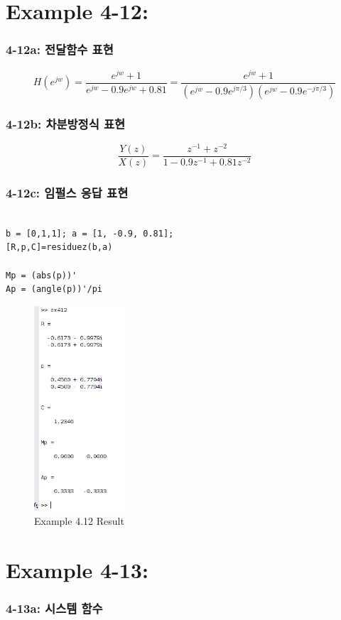 \documentclass[11pt
  , a4paper
  , article
  , oneside
]{memoir}
\begin{document}
\clearpage

\chapter{Example 4-12:}
\subsection{4-12a: 전달함수 표현}

\begin {equation}
H(e^{jw}) = \frac{e^{jw}+1}{e^{jw}-0.9e^{jw} +0.81} = \frac{e^{jw}+1}{(e^{jw}-0.9e^{j\pi/3})(e^{jw}-0.9e^{-j\pi/3})}
\end {equation}

\subsection{4-12b: 차분방정식 표현}
\begin {equation}
\frac{Y(z)}{X(z)} = \frac{z^{-1} + z^{-2}}{1-0.9z^{-1}+0.81z^{-2}}
\end {equation}

\subsection{4-12c: 임펄스 응답 표현}

\begin{lstlisting}[style=termstyle]
%Example 4.12

b = [0,1,1]; a = [1, -0.9, 0.81];
[R,p,C]=residuez(b,a)

Mp = (abs(p))'
Ap = (angle(p))'/pi
\end{lstlisting}

\begin{figure}[h!]
	\centering
	\includegraphics[width=0.3\textwidth,height=0.15\textwidth]{./images/ex412.png}
	\caption{Example 4.12 Result}
	\label{fig:Example 4.12 Result}
\end{figure}

\chapter{Example 4-13:}
\subsection{4-13a: 시스템 함수}
\end{document}

